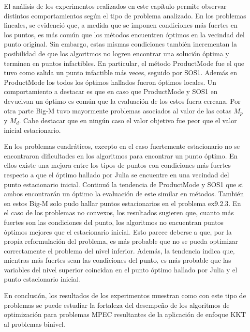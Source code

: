 El análisis de los experimentos realizados en este capítulo permite observar distintos comportamientos según el tipo de problema analizado.
En los problemas lineales, se evidenció que, a medida que se imponen condiciones más fuertes en los puntos, es más común que los métodos encuentren óptimos en la vecindad del punto original. 
Sin embargo, estas mismas condiciones también incrementan la posibilidad de que los algoritmos no logren encontrar una solución óptima y terminen en puntos infactibles. 
En particular, el método ProductMode fue el que tuvo como salida un punto infactible más veces, seguido por SOS1. 
Además en ProductMode los todos los óptimos hallados fueron óptimos locales. 
Un comportamiento a destacar es que en caso que ProductMode y SOS1 en devuelvan un óptimo es común que la evaluación de los estos fuera cercana.
Por otra parte Big-M tuvo mayormente problemas asociados al valor de las cotas $M_p$ y $M_d$. 
Cabe destacar que en ningún caso el valor objetivo fue peor que el valor inicial estacionario. 

En los problemas cuadráticos, excepto en el caso fuertemente estacionario no se encontraron dificultades en los algoritmos para encontrar un punto óptimo. 
En ellos existe una mejora entre los tipos de puntos con condiciones más fuertes respecto a que el óptimo hallado por Julia se encuentre en una vecindad del punto estacionario inicial. 
Continuó la tendencia de ProductMode y SOS1 que si ambos encontrarán un óptimo la evaluación de este similar en métodos. 
También en estos Big-M solo pudo hallar puntos estacionarios en el problema ex9.2.3.
En el caso de los problemas no convexos, los resultados sugieren que, cuanto más fuertes son las condiciones del punto, los algoritmos no encuentran puntos óptimos mejores que el estacionario inicial. Esto parece deberse a que, por la propia reformulación del problema, es más probable que no se pueda optimizar correctamente el problema del nivel inferior. Además, la tendencia indica que, mientras más fuertes sean las condiciones del punto, es más probable que las variables del nivel superior coincidan en el punto óptimo hallado por Julia y el punto estacionario inicial.

En conclusión, los resultados de los experimentos muestran como con este tipo de problemas se puede estudiar la fortaleza del desempeño de los
algoritmos de optimización para problemas MPEC resultantes de la aplicación de enfoque KKT al problemas binivel.

